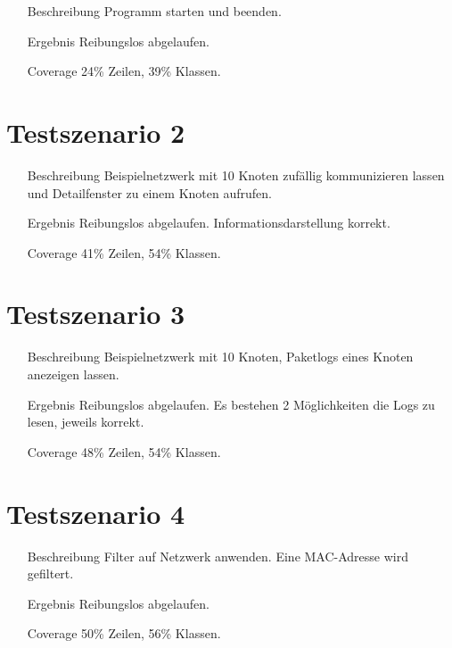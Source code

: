 \begin{enumerate}[leftmargin = *, align=parleft, labelsep=3cm]
  \item[Beschreibung] Programm starten und beenden.
  \item[Ergebnis] Reibungslos abgelaufen.
  \item[Coverage] 24\% Zeilen, 39\% Klassen.
\end{enumerate}

\section{Testszenario 2}

\begin{enumerate}[leftmargin = *, align=parleft, labelsep=3cm]
  \item[Beschreibung] Beispielnetzwerk mit 10 Knoten zufällig kommunizieren lassen und Detailfenster zu einem Knoten aufrufen.
  \item[Ergebnis] Reibungslos abgelaufen. Informationsdarstellung korrekt.
  \item[Coverage] 41\% Zeilen, 54\% Klassen.
\end{enumerate}

\section{Testszenario 3}

\begin{enumerate}[leftmargin = *, align=parleft, labelsep=3cm]
  \item[Beschreibung] Beispielnetzwerk mit 10 Knoten, Paketlogs eines Knoten anezeigen lassen.
  \item[Ergebnis] Reibungslos abgelaufen. Es bestehen 2 Möglichkeiten die Logs zu lesen, jeweils korrekt.
  \item[Coverage] 48\% Zeilen, 54\% Klassen.
\end{enumerate}

\section{Testszenario 4}

\begin{enumerate}[leftmargin = *, align=parleft, labelsep=3cm]
  \item[Beschreibung] Filter auf Netzwerk anwenden. Eine MAC-Adresse wird gefiltert.
  \item[Ergebnis] Reibungslos abgelaufen.
  \item[Coverage] 50\% Zeilen, 56\% Klassen.
\end{enumerate}

